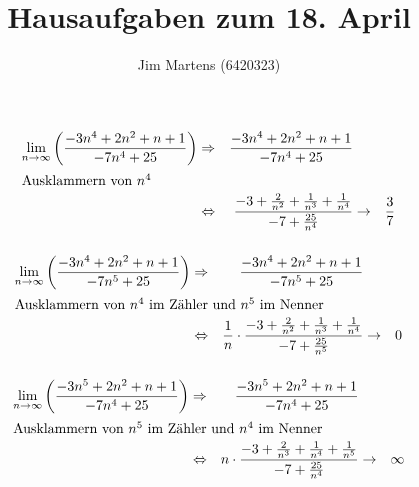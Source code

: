 \documentclass[10pt,a4paper,oneside,ngerman,numbers=noenddot]{scrartcl}
\begin{document}
\author{Jim Martens (6420323)}
\title{Hausaufgaben zum 18. April}
\maketitle
\section{} %
\subsubsection{} %
\begin{alignat*}{3}
\underset{n \rightarrow \infty}{\text{lim}} \left(\frac{-3n^{4}+2n^{2}+n+1}{-7n^{4}+25} \right) &\Rightarrow & \frac{-3n^{4}+2n^{2}+n+1}{-7n^{4}+25} && \\
\intertext{Ausklammern von $n^{4}$}
&\Leftrightarrow & \frac{-3 + \frac{2}{n^{2}} + \frac{1}{n^{3}} + \frac{1}{n^{4}}}{-7 + \frac{25}{n^{4}}} &\rightarrow & \frac{3}{7}
\end{alignat*}
\subsubsection{} %
\begin{alignat*}{3}
\underset{n \rightarrow \infty}{\text{lim}} \left(\frac{-3n^{4}+2n^{2}+n+1}{-7n^{5}+25} \right) &\Rightarrow & \frac{-3n^{4}+2n^{2}+n+1}{-7n^{5}+25} && \\
\intertext{Ausklammern von $n^{4}$ im Zähler und $n^{5}$ im Nenner}
&\Leftrightarrow & \frac{1}{n} \cdot \frac{-3 + \frac{2}{n^{2}} + \frac{1}{n^{3}} + \frac{1}{n^{4}}}{-7 + \frac{25}{n^{5}}} &\rightarrow & 0
\end{alignat*}
\subsubsection{} %
\begin{alignat*}{3}
\underset{n \rightarrow \infty}{\text{lim}} \left(\frac{-3n^{5}+2n^{2}+n+1}{-7n^{4}+25} \right) &\Rightarrow & \frac{-3n^{5}+2n^{2}+n+1}{-7n^{4}+25} && \\
\intertext{Ausklammern von $n^{5}$ im Zähler und $n^{4}$ im Nenner}
&\Leftrightarrow & n \cdot \frac{-3 + \frac{2}{n^{3}} + \frac{1}{n^{4}} + \frac{1}{n^{5}}}{-7 + \frac{25}{n^{4}}} &\rightarrow & \infty
\end{alignat*}
\end{document}
